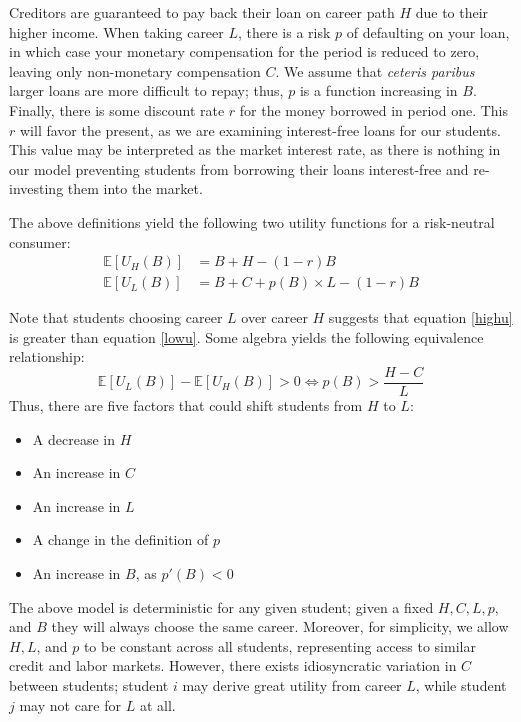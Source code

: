 \documentclass[12pt]{article}
\begin{document}
	Creditors are guaranteed to pay back their loan on career path $H$ due to their higher income. When taking career $L$, there is a risk $p$ of defaulting on your loan, in which case your monetary compensation for the period is reduced to zero, leaving only non-monetary compensation $C$. We assume that \emph{ceteris paribus} larger loans are more difficult to repay; thus, $p$ is a function increasing in $B$. Finally, there is some discount rate $r$ for the money borrowed in period one. This $r$ will favor the present, as we are examining interest-free loans for our students. This value may be interpreted as the market interest rate, as there is nothing in our model preventing students from borrowing their loans interest-free and re-investing them into the market. 
	
	The above definitions yield the following two utility functions for a risk-neutral consumer: 
	\begin{align}
	\mathbb{E}\left[U_H(B)\right] &= B + H - (1 - r)B \label{highu}\\
	\mathbb{E}\left[U_L(B)\right] &= B + C + p(B) \times L - (1 - r)B \label{lowu}
	\end{align}
	
	Note that students choosing career $L$ over career $H$ suggests that equation \ref{highu} is greater than equation \ref{lowu}. Some algebra yields the following equivalence relationship: 
	\begin{equation}
	\mathbb{E}\left[U_L(B)\right] - \mathbb{E}\left[U_H(B)\right] > 0 \iff p(B) > \frac{H - C}{L} \label{choicecon}
	\end{equation} 
	Thus, there are five factors that could shift students from $H$ to $L$:
	\begin{itemize}
		\singlespacing
		\item A decrease in $H$
		\item An increase in $C$
		\item An increase in $L$
		\item A change in the definition of $p$
		\item An increase in $B$, as $p'(B) < 0$
	\end{itemize}

	The above model is deterministic for any given student; given a fixed $H, C, L, p,$ and $B$ they will always choose the same career. Moreover, for simplicity, we allow $H, L$, and $p$ to be constant across all students, representing access to similar credit and labor markets. However, there exists idiosyncratic variation in $C$ between students; student $i$ may derive great utility from career $L$, while student $j$ may not care for $L$ at all.
\end{document}
